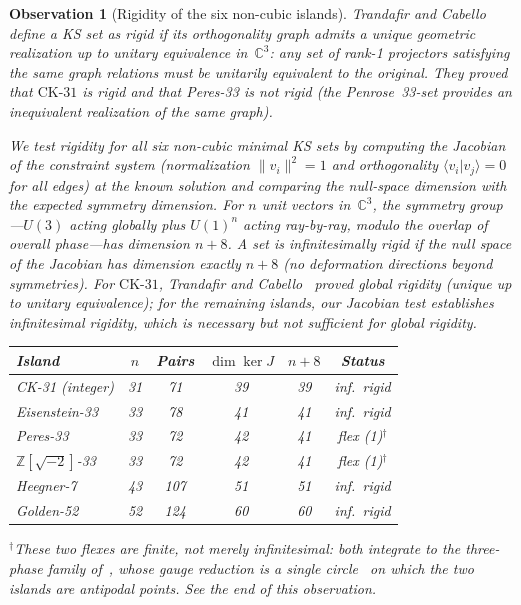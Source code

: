 \documentclass[12pt,a4paper]{article}
\newtheorem{observation}[theorem]{Observation}
\newcommand{\C}{\mathbb{C}}
\newcommand{\Z}{\mathbb{Z}}
\newcommand{\braket}[2]{\langle#1|#2\rangle}
\newcommand{\CK}{\mathrm{CK}\text{-}31}
\begin{document}
\begin{observation}[Rigidity of the six non-cubic islands]\label{obs:rigidity}
Trandafir and Cabello~\cite{TrandafirCabello2025} define a KS set as \emph{rigid} if its orthogonality graph admits a unique geometric realization up to unitary equivalence in~$\C^3$: any set of rank-1 projectors satisfying the same graph relations must be unitarily equivalent to the original.  They proved that $\CK$ is rigid and that Peres-33 is not rigid (the Penrose~33-set provides an inequivalent realization of the same graph).

We test rigidity for all six non-cubic minimal KS sets by computing the Jacobian of the constraint system (normalization $\|v_i\|^2 = 1$ and orthogonality $\braket{v_i}{v_j} = 0$ for all edges) at the known solution and comparing the null-space dimension with the expected symmetry dimension.  For $n$ unit vectors in~$\C^3$, the symmetry group---$U(3)$ acting globally plus $U(1)^n$ acting ray-by-ray, modulo the overlap of overall phase---has dimension $n + 8$.  A set is \emph{infinitesimally rigid} if the null space of the Jacobian has dimension exactly $n + 8$ (no deformation directions beyond symmetries).  For $\CK$, Trandafir and Cabello~\cite{TrandafirCabello2025} proved \emph{global} rigidity (unique up to unitary equivalence); for the remaining islands, our Jacobian test establishes infinitesimal rigidity, which is necessary but not sufficient for global rigidity.

\medskip
\begin{center}
\renewcommand{\arraystretch}{1.1}
\begin{tabular}{lccccc}
\hline
Island & $n$ & Pairs & $\dim\ker J$ & $n{+}8$ & Status \\
\hline
CK-31 (integer)   & 31 & 71  & 39 & 39 & inf.\ rigid \\
Eisenstein-33      & 33 & 78  & 41 & 41 & inf.\ rigid \\
Peres-33           & 33 & 72  & 42 & 41 & flex (1)$^\dagger$ \\
$\Z[\sqrt{-2}]$-33 & 33 & 72 & 42 & 41 & flex (1)$^\dagger$ \\
Heegner-7          & 43 & 107 & 51 & 51 & inf.\ rigid \\
Golden-52          & 52 & 124 & 60 & 60 & inf.\ rigid \\
\hline
\end{tabular}
\end{center}

\smallskip\noindent$^\dagger$These two flexes are \emph{finite}, not merely infinitesimal: both integrate to the three-phase family of~\cite{GouldAravind2010}, whose gauge reduction is a single circle~\cite{FloresGordillo2026} on which the two islands are antipodal points.  See the end of this observation.
\medskip


\end{observation}
\end{document}

